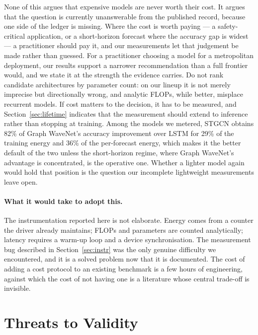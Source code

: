 \documentclass[manuscript,screen,review]{acmart}
\begin{document}
None of this argues that expensive models are never worth their cost. It
argues that the question is currently unanswerable from the published record,
because one side of the ledger is missing. Where the cost is worth paying ---
a safety-critical application, or a short-horizon forecast where the accuracy
gap is widest --- a practitioner should pay it, and our measurements let that
judgement be made rather than guessed.
For a practitioner choosing a model for a metropolitan deployment, our results
support a narrower recommendation than a full frontier would, and we state it
at the strength the evidence carries. Do not rank candidate architectures by
parameter count: on our lineup it is not merely imprecise but directionally
wrong, and analytic FLOPs, while better, misplace recurrent models. If cost
matters to the decision, it has to be measured, and Section~\ref{sec:lifetime}
indicates that the measurement should extend to inference rather than stopping
at training. Among the models we metered, STGCN obtains 82\% of Graph
WaveNet's accuracy improvement over LSTM for 29\% of the training energy and
36\% of the per-forecast energy, which makes it the better default of the two
unless the short-horizon regime, where Graph WaveNet's advantage is
concentrated, is the operative one. Whether a lighter model again would hold
that position is the question our incomplete lightweight measurements leave
open.

\paragraph{What it would take to adopt this.} The instrumentation reported
here is not elaborate. Energy comes from a counter the driver already
maintains; FLOPs and parameters are counted analytically; latency requires a
warm-up loop and a device synchronisation. The measurement bug described in
Section~\ref{sec:instr} was the only genuine difficulty we encountered, and it
is a solved problem now that it is documented. The cost of adding a cost
protocol to an existing benchmark is a few hours of engineering, against which
the cost of not having one is a literature whose central trade-off is
invisible.

\section{Threats to Validity}
\label{sec:threats}
\end{document}

